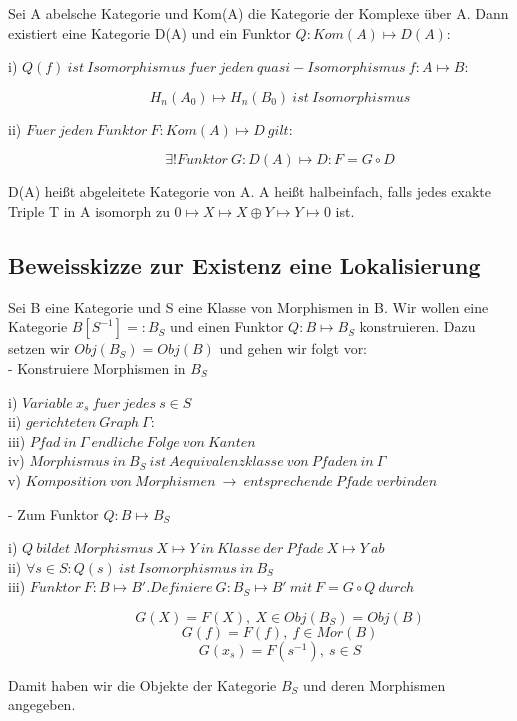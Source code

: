 \documentclass[12pt]{article}
\begin{document}
Sei A abelsche Kategorie und Kom(A) die Kategorie der Komplexe über A.
Dann existiert eine Kategorie D(A) und ein Funktor $Q: Kom(A) \mapsto D(A):$
\begin{description}
    \item[i) $Q(f) \: ist \: Isomorphismus \: fuer \: jeden \: quasi-Isomorphismus \: f: A \mapsto B$:]
        \[H_n(A_0) \mapsto H_n(B_0) \: ist \: Isomorphismus\]
    \item[ii) $Fuer \: jeden \: Funktor \: F : Kom(A) \mapsto D \: gilt$:]
        \[\exists! Funktor \: G : D(A) \mapsto D: F = G \circ D\]
\end{description}
D(A) heißt abgeleitete Kategorie von A. A heißt halbeinfach, falls jedes exakte Triple
T in A isomorph zu $0 \mapsto X \mapsto X \oplus Y \mapsto Y \mapsto 0$ ist. 

\subsection{Beweisskizze zur Existenz eine Lokalisierung}

Sei B eine Kategorie und S eine Klasse von Morphismen in B. Wir wollen eine Kategorie $B[S^{-1}] =: B_S$ und einen 
Funktor $Q : B \mapsto B_S$ konstruieren. Dazu setzen wir $Obj(B_S) = Obj(B)$ und gehen wir folgt vor:\\
- Konstruiere Morphismen in $B_S$
\begin{description}
    \item[i) $Variable \: x_s \: fuer \: jedes \: s \in S$]
    \item[ii) $gerichteten \: Graph \: \Gamma$:]
    \item[iii) $Pfad \: in \: \Gamma \: endliche \: Folge \: von \: Kanten$]
    \item[iv) $Morphismus \: in \: B_S \: ist \: Aequivalenzklasse \: von \: Pfaden \: in \: \Gamma$]
    \item[v) $Komposition \: von \: Morphismen \: \rightarrow \: entsprechende \: Pfade \: verbinden $]
\end{description}
- Zum Funktor $Q : B \mapsto B_S$
\begin{description}
    \item[i) $Q \: bildet \: Morphismus \: X \mapsto Y \: in \: Klasse \: der \: Pfade \: X \mapsto Y \: ab$]
    \item[ii) $\forall s \in S : Q(s) \: ist \: Isomorphismus \: in \: B_S$]
    \item[iii) $Funktor \: F : B \mapsto B'. Definiere \: G : B_S \mapsto B' \: mit \: F = G \circ Q \: durch$]
        \[G(X) = F(X), \: X \in Obj(B_S) = Obj(B)\]
        \[G(f) = F(f), \: f \in Mor(B)\]
        \[G(x_s) = F(s^{-1}), \: s \in S\]
\end{description}
Damit haben wir die Objekte der Kategorie $B_S$ und deren Morphismen angegeben.
\end{document}
